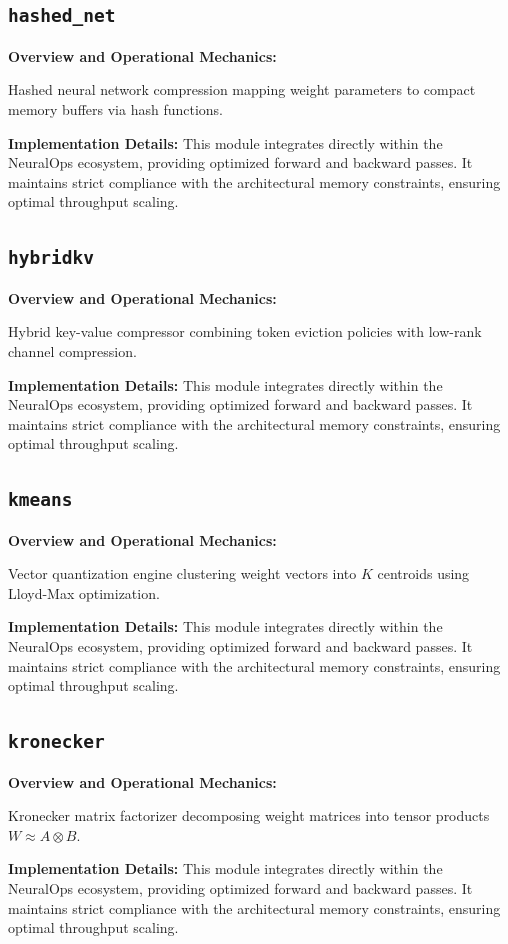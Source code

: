 \documentclass[10pt,twocolumn,letterpaper]{article}
\begin{document}
\subsection{\texttt{hashed\_net}}
\textbf{Overview and Operational Mechanics:}

Hashed neural network compression mapping weight parameters to compact memory buffers via hash functions.

\textbf{Implementation Details:}
This module integrates directly within the NeuralOps ecosystem, providing optimized forward and backward passes. It maintains strict compliance with the architectural memory constraints, ensuring optimal throughput scaling.

\subsection{\texttt{hybridkv}}
\textbf{Overview and Operational Mechanics:}

Hybrid key-value compressor combining token eviction policies with low-rank channel compression.

\textbf{Implementation Details:}
This module integrates directly within the NeuralOps ecosystem, providing optimized forward and backward passes. It maintains strict compliance with the architectural memory constraints, ensuring optimal throughput scaling.

\subsection{\texttt{kmeans}}
\textbf{Overview and Operational Mechanics:}

Vector quantization engine clustering weight vectors into $K$ centroids using Lloyd-Max optimization.

\textbf{Implementation Details:}
This module integrates directly within the NeuralOps ecosystem, providing optimized forward and backward passes. It maintains strict compliance with the architectural memory constraints, ensuring optimal throughput scaling.

\subsection{\texttt{kronecker}}
\textbf{Overview and Operational Mechanics:}

Kronecker matrix factorizer decomposing weight matrices into tensor products $W \approx A \otimes B$.

\textbf{Implementation Details:}
This module integrates directly within the NeuralOps ecosystem, providing optimized forward and backward passes. It maintains strict compliance with the architectural memory constraints, ensuring optimal throughput scaling.
\end{document}
